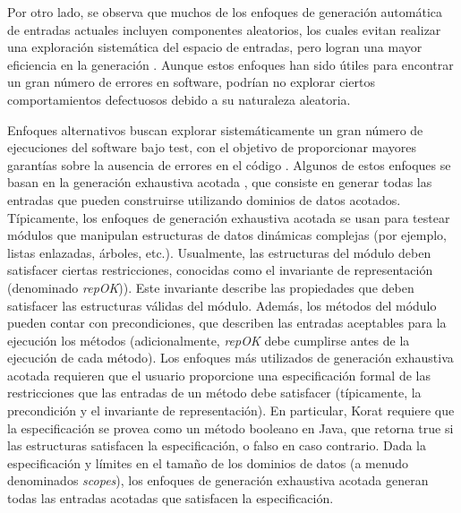 Por otro lado, se observa que muchos de los enfoques de generación automática de
entradas actuales incluyen componentes aleatorios, los cuales evitan realizar una exploración 
sistemática del espacio de entradas, pero logran una mayor eficiencia en la generación \cite{Pacheco07, Ma15, Fraser11}. 
Aunque estos enfoques han sido útiles para encontrar un gran número de errores en software, podrían no 
explorar ciertos comportamientos defectuosos debido a su naturaleza aleatoria.

Enfoques alternativos buscan explorar sistemáticamente un gran número de
ejecuciones del software bajo test, 
con el objetivo de proporcionar mayores garantías sobre la ausencia de errores
en el código \cite{Marinov01, Boyapati02, Godefroid05, Godefroid18, Cadar08, Luckow14}. 
Algunos de estos enfoques se basan en la generación exhaustiva acotada \cite{Marinov01, Boyapati02}, 
que consiste en generar todas las entradas que pueden construirse utilizando dominios de datos acotados. 
Típicamente, los enfoques de generación exhaustiva acotada se usan para testear
módulos que manipulan estructuras de datos dinámicas complejas (por ejemplo, listas enlazadas, árboles, etc.). 
Usualmente, las estructuras del módulo deben satisfacer ciertas restricciones,
conocidas como el invariante de representación (denominado \textit{repOK})). Este invariante 
describe las propiedades que deben satisfacer las estructuras válidas del
módulo. Además, los métodos del módulo pueden contar con precondiciones, que
describen las entradas aceptables para la ejecución los métodos (adicionalmente,
\textit{repOK} debe cumplirse antes de la ejecución de cada método). 
Los enfoques más utilizados de generación exhaustiva acotada requieren que el
usuario proporcione una especificación formal de las restricciones que las
entradas de un método debe satisfacer \cite{Marinov01, Boyapati02} (típicamente,
la precondición y el invariante de representación). En particular, Korat
requiere que la especificación se provea como un método booleano en Java, que 
retorna true si las estructuras satisfacen la especificación, o falso en caso
contrario.
Dada la especificación y límites en el tamaño de los dominios de datos
\cite{Marinov01, Boyapati02} (a menudo denominados \textit{scopes}), los
enfoques de generación exhaustiva acotada generan todas las entradas acotadas
que satisfacen la especificación.

